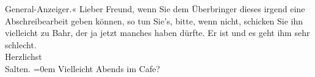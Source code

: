 \begin{ledgroupsized}[t]{13cm}
{{                        General-Anzeiger.«}}\pend
           \pstart
           {\pb}Lieber Freund, wenn Sie dem Überbringer dieses irgend eine
               Abschreibearbeit geben können, so tun Sie's, bitte, wenn nicht, schicken Sie ihn
               vielleicht zu Bahr, der ja jetzt manches haben
               dürfte. \pend
           \pstart
           Er ist \label{K_L03147-1v}\label{K_L03147-1h} und es geht ihm sehr schlecht. \pend
           \pstart
           {\\[\baselineskip]}Herzlichst {\\[\baselineskip]}\spacefill\mbox{Salten.}\pend
           \leftskip=0em{}\pstart
           \noindent{}Vielleicht Abends im Cafe?\pend
           
         
         \endnumbering{}\end{ledgroupsized}\begin{anhang}\end{anhang}\newcommand{\dateiname}{L03147}\newcommand{\titel}{Felix Salten an Arthur Schnitzler, 15. 9. 189[4?]}\newcommand{\editorInnen}{Martin Anton Müller und Laura Untner}
      